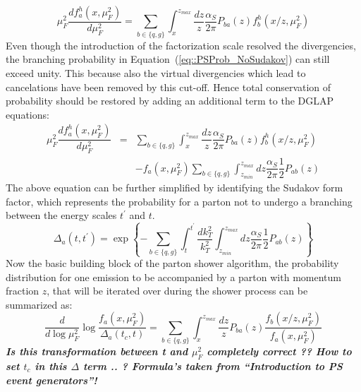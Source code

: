 \begin{equation}\label{eq::PSProb_NoSudakov}
 \mu_{F}^2 \dfrac{d f_{a}^{h}(x,\mu_{F}^{2})}{d \mu_{F}^{2}} = \sum_{b \in \{q,g\} } \int_{x}^{z_{max}} \dfrac{dz}{z} \dfrac{\alpha_{S}}{2 \pi} P_{ba}(z) f_{b}^{h}(x/z, \mu_{F}^{2})
\end{equation}
Even though the introduction of the factorization scale resolved the divergencies, the branching probability in Equation~(\ref{eq::PSProb_NoSudakov}) can still exceed unity. This because also the virtual divergencies which lead to cancelations have been removed by this cut-off. Hence total conservation of probability should be restored by adding an additional term to the DGLAP equations:
\begin{eqnarray}
 \mu_{F}^2 \dfrac{d f_{a}^{h}(x,\mu_{F}^{2})}{d \mu_{F}^{2}} & = & \sum_{b \in \{q,g\} } \int_{x}^{z_{max}} \dfrac{dz}{z} \dfrac{\alpha_{S}}{2 \pi} P_{ba}(z) f_{b}^{h}(x/z, \mu_{F}^{2}) \nonumber \\
                                                             &   & - f_{a}(x,\mu_{F}^{2}) \sum_{b \in \{q,g\}} \int_{z_{min}}^{z_{max}} dz \dfrac{\alpha_{S}}{2 \pi} \dfrac{1}{2} P_{ab}(z)
\end{eqnarray}
The above equation can be further simplified by identifying the Sudakov form factor, which represents the probability for a parton not to undergo a branching between the energy scales $t^{'}$ and $t$.
\begin{equation}
 \Delta_{a}(t,t^{'}) = \exp \left\lbrace - \sum_{b \in \{q,g\}} \int_{t}^{t^{'}} \dfrac{dk_{T}^{2}}{k_{T}^{2}} \int_{z_{min}}^{z_{max}} dz \dfrac{\alpha_{S}}{2 \pi} \dfrac{1}{2} P_{ab}(z) \right\rbrace
\end{equation}
Now the basic building block of the parton shower algorithm, the probability distribution for one emission to be accompanied by a parton with momentum fraction $z$, that will be iterated over during the shower process can be summarized as:
\begin{equation}
 \dfrac{d}{d \log \mu_{F}^{2}} \log \dfrac{f_{a}(x,\mu_{F}^{2})}{\Delta_{a}(t_{c},t)} = \sum_{b \in \{q,g\}} \int_{x}^{z_{max}} \dfrac{dz}{z} P_{ba}(z) \dfrac{f_{b}(x/z,\mu_{F}^{2})}{f_{a}(x,\mu_{F}^{2})}
\end{equation}
\textit{\textbf{Is this transformation between t and $\mu_{F}^{2}$ completely correct ??  How to set $t_c$ in this $\Delta$ term .. ? Formula's taken from ``Introduction to PS event generators''!}}\\

